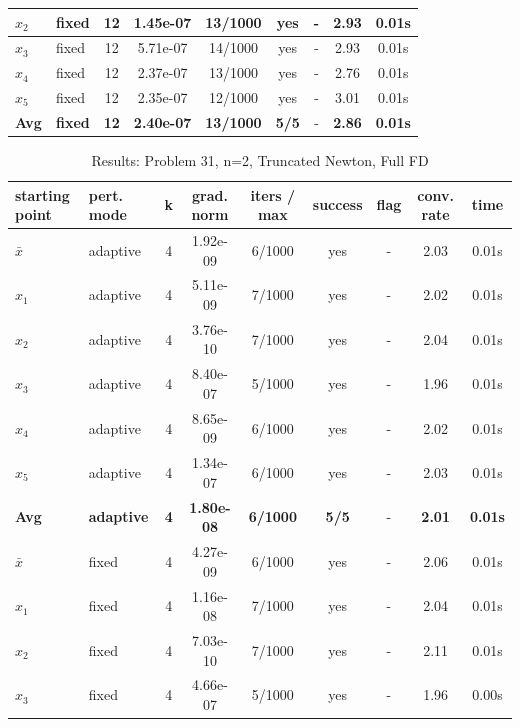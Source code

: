 \begin{longtable}{|l|l|c|c|c|c|c|c|c|}
\hline
$x_2$ & fixed & 12 & 1.45e-07 & 13/1000 & yes & - & 2.93 & 0.01s \\
\hline
$x_3$ & fixed & 12 & 5.71e-07 & 14/1000 & yes & - & 2.93 & 0.01s \\
\hline
$x_4$ & fixed & 12 & 2.37e-07 & 13/1000 & yes & - & 2.76 & 0.01s \\
\hline
$x_5$ & fixed & 12 & 2.35e-07 & 12/1000 & yes & - & 3.01 & 0.01s \\
\hline
\hline\hline
\textbf{Avg} & \textbf{fixed} & \textbf{12} & \textbf{2.40e-07} & \textbf{13/1000} & \textbf{5/5} & - & \textbf{2.86} & \textbf{0.01s} \\
\hline\hline
\end{longtable}


\begin{longtable}{|l|l|c|c|c|c|c|c|c|}
\caption{Results: Problem 31, n=2, Truncated Newton, Full FD} \\
\hline
\textbf{starting point} & \textbf{pert. mode} & \textbf{k} & \textbf{grad. norm} & \textbf{iters / max} & \textbf{success} & \textbf{flag} & \textbf{conv. rate} & \textbf{time} \\
\hline
\endfirsthead
\endhead
\endfoot
\hline
\endlastfoot
$\bar{x}$ & adaptive & 4 & 1.92e-09 & 6/1000 & yes & - & 2.03 & 0.01s \\
\hline
$x_1$ & adaptive & 4 & 5.11e-09 & 7/1000 & yes & - & 2.02 & 0.01s \\
\hline
$x_2$ & adaptive & 4 & 3.76e-10 & 7/1000 & yes & - & 2.04 & 0.01s \\
\hline
$x_3$ & adaptive & 4 & 8.40e-07 & 5/1000 & yes & - & 1.96 & 0.01s \\
\hline
$x_4$ & adaptive & 4 & 8.65e-09 & 6/1000 & yes & - & 2.02 & 0.01s \\
\hline
$x_5$ & adaptive & 4 & 1.34e-07 & 6/1000 & yes & - & 2.03 & 0.01s \\
\hline
\hline\hline
\textbf{Avg} & \textbf{adaptive} & \textbf{4} & \textbf{1.80e-08} & \textbf{6/1000} & \textbf{5/5} & - & \textbf{2.01} & \textbf{0.01s} \\
\hline\hline
\hline
$\bar{x}$ & fixed & 4 & 4.27e-09 & 6/1000 & yes & - & 2.06 & 0.01s \\
\hline
$x_1$ & fixed & 4 & 1.16e-08 & 7/1000 & yes & - & 2.04 & 0.01s \\
\hline
$x_2$ & fixed & 4 & 7.03e-10 & 7/1000 & yes & - & 2.11 & 0.01s \\
\hline
$x_3$ & fixed & 4 & 4.66e-07 & 5/1000 & yes & - & 1.96 & 0.00s \\

\end{longtable}
